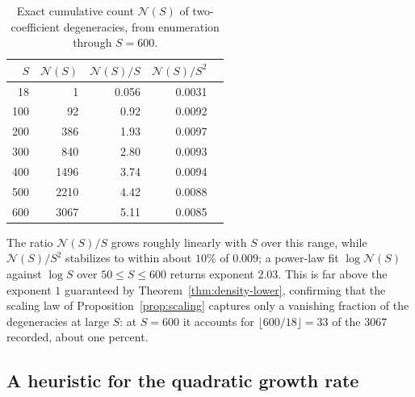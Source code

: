 \documentclass[12pt, letterpaper]{article}
\theoremstyle{definition}
\theoremstyle{plain}
\begin{document}
\begin{table}[h!]
\centering
\caption{Exact cumulative count $\mathcal N(S)$ of two-coefficient degeneracies, from enumeration through $S=600$.}
\label{tab:density}
\begin{tabular}{rrrrr}
\toprule
$S$ & $\mathcal N(S)$ & $\mathcal N(S)/S$ & $\mathcal N(S)/S^2$ & \\
\midrule
18   & 1    & 0.056 & 0.0031 & \\
100  & 92   & 0.92  & 0.0092 & \\
200  & 386  & 1.93  & 0.0097 & \\
300  & 840  & 2.80  & 0.0093 & \\
400  & 1496 & 3.74  & 0.0094 & \\
500  & 2210 & 4.42  & 0.0088 & \\
600  & 3067 & 5.11  & 0.0085 & \\
\bottomrule
\end{tabular}
\end{table}

The ratio $\mathcal N(S)/S$ grows roughly linearly with $S$ over this range, while $\mathcal N(S)/S^2$ stabilizes to within about $10\%$ of $0.009$; a power-law fit $\log\mathcal N(S)$ against $\log S$ over $50\le S\le600$ returns exponent $2.03$. This is far above the exponent $1$ guaranteed by Theorem~\ref{thm:density-lower}, confirming that the scaling law of Proposition~\ref{prop:scaling} captures only a vanishing fraction of the degeneracies at large $S$: at $S=600$ it accounts for $\lfloor600/18\rfloor=33$ of the $3067$ recorded, about one percent.

\subsection{A heuristic for the quadratic growth rate}
\end{document}
